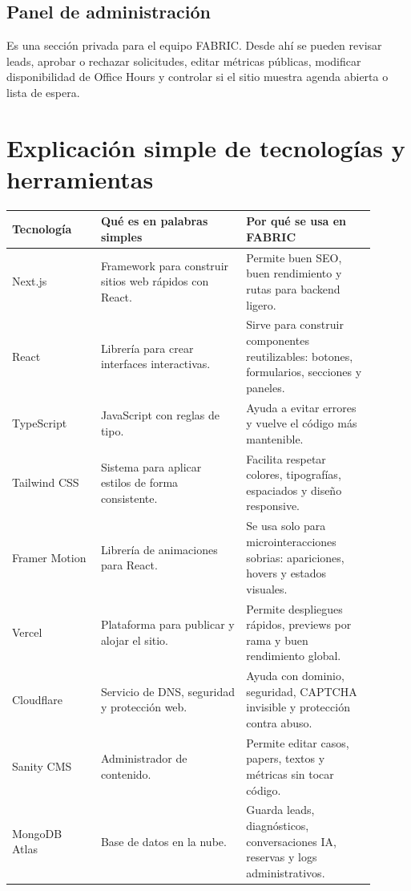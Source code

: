 \documentclass[11pt,letterpaper]{article}
\begin{document}
\subsection{Panel de administraci\'on}

Es una secci\'on privada para el equipo FABRIC. Desde ah\'i se pueden revisar leads, aprobar o rechazar solicitudes, editar m\'etricas p\'ublicas, modificar disponibilidad de Office Hours y controlar si el sitio muestra agenda abierta o lista de espera.

\section{Explicaci\'on simple de tecnolog\'ias y herramientas}

\begin{longtable}{p{0.22\linewidth}p{0.36\linewidth}p{0.32\linewidth}}
\toprule
\textbf{Tecnolog\'ia} & \textbf{Qu\'e es en palabras simples} & \textbf{Por qu\'e se usa en FABRIC} \\
\midrule
Next.js & Framework para construir sitios web r\'apidos con React. & Permite buen SEO, buen rendimiento y rutas para backend ligero. \\
React & Librer\'ia para crear interfaces interactivas. & Sirve para construir componentes reutilizables: botones, formularios, secciones y paneles. \\
TypeScript & JavaScript con reglas de tipo. & Ayuda a evitar errores y vuelve el c\'odigo m\'as mantenible. \\
Tailwind CSS & Sistema para aplicar estilos de forma consistente. & Facilita respetar colores, tipograf\'ias, espaciados y dise\~no responsive. \\
Framer Motion & Librer\'ia de animaciones para React. & Se usa solo para microinteracciones sobrias: apariciones, hovers y estados visuales. \\
Vercel & Plataforma para publicar y alojar el sitio. & Permite despliegues r\'apidos, previews por rama y buen rendimiento global. \\
Cloudflare & Servicio de DNS, seguridad y protecci\'on web. & Ayuda con dominio, seguridad, CAPTCHA invisible y protecci\'on contra abuso. \\
Sanity CMS & Administrador de contenido. & Permite editar casos, papers, textos y m\'etricas sin tocar c\'odigo. \\
MongoDB Atlas & Base de datos en la nube. & Guarda leads, diagn\'osticos, conversaciones IA, reservas y logs administrativos. \\

\end{longtable}
\end{document}
